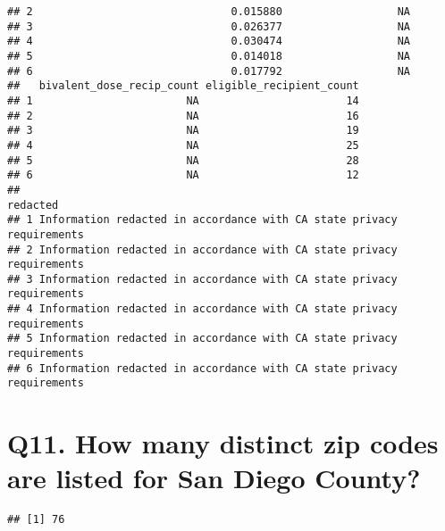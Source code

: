 \documentclass[
]{article}
\newenvironment{Shaded}{\begin{snugshade}}{\end{snugshade}}
\newcommand{\FloatTok}[1]{\textcolor[rgb]{0.00,0.00,0.81}{#1}}
\newcommand{\FunctionTok}[1]{\textcolor[rgb]{0.00,0.00,0.00}{#1}}
\newcommand{\NormalTok}[1]{#1}
\newcommand{\SpecialCharTok}[1]{\textcolor[rgb]{0.00,0.00,0.00}{#1}}
\begin{document}
\begin{verbatim}
## 2                               0.015880                  NA
## 3                               0.026377                  NA
## 4                               0.030474                  NA
## 5                               0.014018                  NA
## 6                               0.017792                  NA
##   bivalent_dose_recip_count eligible_recipient_count
## 1                        NA                       14
## 2                        NA                       16
## 3                        NA                       19
## 4                        NA                       25
## 5                        NA                       28
## 6                        NA                       12
##                                                                redacted
## 1 Information redacted in accordance with CA state privacy requirements
## 2 Information redacted in accordance with CA state privacy requirements
## 3 Information redacted in accordance with CA state privacy requirements
## 4 Information redacted in accordance with CA state privacy requirements
## 5 Information redacted in accordance with CA state privacy requirements
## 6 Information redacted in accordance with CA state privacy requirements
\end{verbatim}

\hypertarget{q11.-how-many-distinct-zip-codes-are-listed-for-san-diego-county}{%
\section{Q11. How many distinct zip codes are listed for San Diego
County?}\label{q11.-how-many-distinct-zip-codes-are-listed-for-san-diego-county}}

\begin{Shaded}
\end{Shaded}

\begin{verbatim}
## [1] 76
\end{verbatim}

\begin{Shaded}
\end{Shaded}
\end{document}
